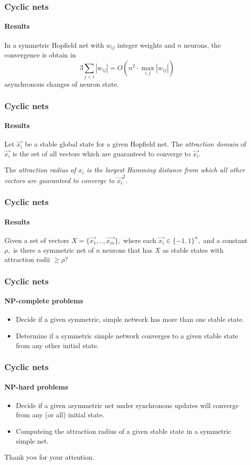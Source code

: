 \documentclass{beamer}
\begin{document}
\begin{frame}
\frametitle{Cyclic nets}
\framesubtitle{Results}
\begin{theorem}
	In a symmetric Hopfield net with $w_{ij}$ integer weights and $n$ neurons, the convergence is obtain in 
	\[
	3 \sum_{j<i} |w_{ij}| = O(n^2 \cdot \max_{i,j} |w_{ij}|)
	\]
	asynchronous changes of neuron state.
\end{theorem}
\end{frame}

\begin{frame}
	\frametitle{Cyclic nets}
	\framesubtitle{Results}
	\begin{definition}
		Let $\vec{x_i}$ be a stable global state for a given Hopfield net. The \textit{attraction domain} \rm of $\vec{x_i}$ is the set of all vectors which are guaranteed to converge to $\vec{x_i}.$
	\end{definition}
	\begin{definition}
		The \it attraction radius \rm of $x_i$ is the largest Hamming distance from which all other vectors are guaranteed to converge to $\vec{x_i}^2.$
	\end{definition}
\end{frame}

\begin{frame}
\frametitle{Cyclic nets}
\framesubtitle{Results}
\begin{definition}
	Given a set of vectors $X=\{\vec{x_1}, .., \vec{x_m}\},$ where each $\vec{x_i} \in \{-1,1\}^n,$ and a constant $\rho,$ is there a symmetric net of $n$ neurons that has $X$ as stable states with attraction radii $\geq \rho?$
\end{definition}
\end{frame}

\begin{frame}
\frametitle{Cyclic nets}
\framesubtitle{NP-complete problems}
	\begin{itemize}
		\item Decide if a given symmetric, simple network has more than one stable state.
		\item Determine if a symmetric simple network converges to a given stable state from any other initial state.
	\end{itemize}
\end{frame}

\begin{frame}
\frametitle{Cyclic nets}
\framesubtitle{NP-hard problems}
\begin{itemize}
	\item Decide if a given asymmetric net under synchronous updates will converge from any (or all) initial state.
	\item Computeing the attraction radius of a given stable state in a symmetric simple net.
\end{itemize}
\end{frame}

\begin{frame}
\begin{center}
	Thank you for your attention.
\end{center}
\end{frame}
\end{document}
